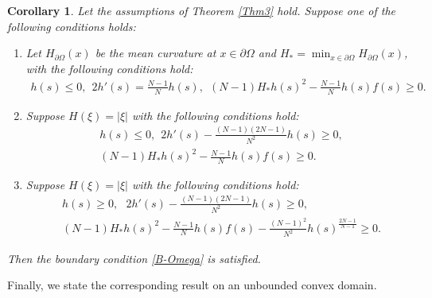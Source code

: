 \documentclass[10pt,a4paper]{amsart}
\numberwithin{equation}{section}
\newtheorem{cor}[thm]{Corollary}
\newcommand{\pa}{\partial}
\begin{document}
\begin{cor}\label{cor4}
    Let the assumptions of Theorem \ref{Thm3} hold. Suppose one of the following conditions holds:
    \begin{enumerate}[label=(\roman*)]
        \item Let $H_{\pa \Omega}(x)$ be the mean curvature at $x \in \pa \Omega$ and $H_* = \min_{x \in \pa \Omega} H_{\pa \Omega}(x)$, with the following conditions hold:
        \begin{align*}
               h(s) \leq 0, \ \ 2 h'(s) = \frac{N-1}{N}h(s), \ \ (N-1)H_* h(s)^2 - \frac{N-1}{N} h(s) f(s) \geq 0.
        \end{align*}
        \item Suppose $H(\xi)=|\xi|$ with the following conditions hold:
         \begin{align*}
             & h(s) \leq 0, \ \ 2 h'(s) - \frac{(N-1)(2N-1)}{N^2}h(s) \geq 0, \\
             & (N-1)H_* h(s)^2 - \frac{N-1}{N} h(s) f(s) \geq 0.
        \end{align*}
        \item Suppose $H(\xi)=|\xi|$ with the following conditions hold:
         \begin{align*}
             & h(s) \geq 0, \ \ \ 2 h'(s) - \frac{(N-1)(2N-1)}{N^2}h(s) \geq 0, \\
             & (N-1)H_* h(s)^2 - \frac{N-1}{N} h(s) f(s) - \frac{(N-1)^2}{N^2} h(s)^{\frac{2N-1}{N-1}} \geq 0.
        \end{align*}
    \end{enumerate}
    Then the boundary condition \eqref{B-Omega} is satisfied.
\end{cor}



Finally, we state the corresponding result on an unbounded convex domain.
\end{document}
